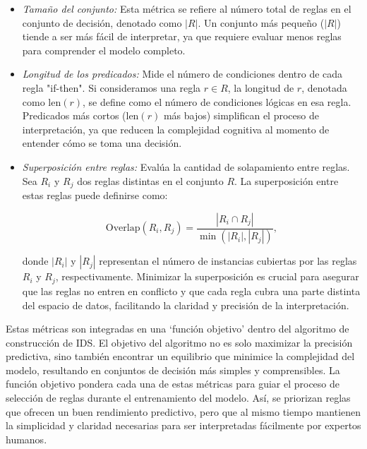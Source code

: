 \begin{itemize}
    \item \textit{Tamaño del conjunto:} Esta métrica se refiere al número total de reglas en el conjunto de decisión, denotado como \( |R| \). Un conjunto más pequeño (\( |R| \)) tiende a ser más fácil de interpretar, ya que requiere evaluar menos reglas para comprender el modelo completo.
    
    \item \textit{Longitud de los predicados:} Mide el número de condiciones dentro de cada regla "if-then". Si consideramos una regla \( r \in R \), la longitud de \( r \), denotada como \( \text{len}(r) \), se define como el número de condiciones lógicas en esa regla. Predicados más cortos (\( \text{len}(r) \) más bajos) simplifican el proceso de interpretación, ya que reducen la complejidad cognitiva al momento de entender cómo se toma una decisión.
    
    \item \textit{Superposición entre reglas:} Evalúa la cantidad de solapamiento entre reglas. Sea \( R_i \) y \( R_j \) dos reglas distintas en el conjunto \( R \). La superposición entre estas reglas puede definirse como:

\begin{equation}
\text{Overlap}(R_i, R_j) = \frac{|R_i \cap R_j|}{\min(|R_i|, |R_j|)},
\end{equation}

donde \( |R_i| \) y \( |R_j| \) representan el número de instancias cubiertas por las reglas \( R_i \) y \( R_j \), respectivamente. Minimizar la superposición es crucial para asegurar que las reglas no entren en conflicto y que cada regla cubra una parte distinta del espacio de datos, facilitando la claridad y precisión de la interpretación.

\end{itemize}


Estas métricas son integradas en una ‘función objetivo’ dentro del algoritmo de construcción de IDS. El objetivo del algoritmo no es solo maximizar la precisión predictiva, sino también encontrar un equilibrio que minimice la complejidad del modelo, resultando en conjuntos de decisión más simples y comprensibles. La función objetivo pondera cada una de estas métricas para guiar el proceso de selección de reglas durante el entrenamiento del modelo. Así, se priorizan reglas que ofrecen un buen rendimiento predictivo, pero que al mismo tiempo mantienen la simplicidad y claridad necesarias para ser interpretadas fácilmente por expertos humanos.

